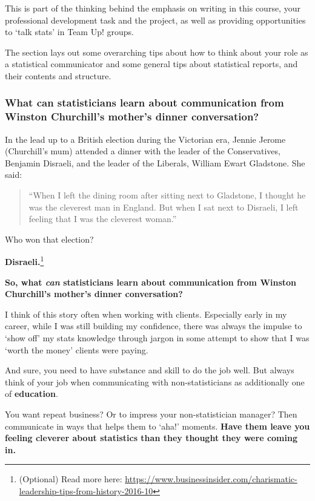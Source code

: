 \documentclass[
  openany]{book}
\begin{document}
This is part of the thinking behind the emphasis on writing in this course, your professional development task and the project, as well as providing opportunities to `talk stats' in Team Up! groups.

The section lays out some overarching tips about how to think about your role as a statistical communicator and some general tips about statistical reports, and their contents and structure.

\hypertarget{what-can-statisticians-learn-about-communication-from-winston-churchills-mothers-dinner-conversation}{%
\subsubsection{What can statisticians learn about communication from Winston Churchill's mother's dinner conversation?}\label{what-can-statisticians-learn-about-communication-from-winston-churchills-mothers-dinner-conversation}}

In the lead up to a British election during the Victorian era, Jennie Jerome (Churchill's mum) attended a dinner with the leader of the Conservatives, Benjamin Disraeli, and the leader of the Liberals, William Ewart Gladstone. She said:

\begin{quote}
``When I left the dining room after sitting next to Gladstone, I thought he was the cleverest man in England. But when I sat next to Disraeli, I left feeling that I was the cleverest woman.''
\end{quote}

Who won that election?

\textbf{Disraeli.}\footnote{(Optional) Read more here: \url{https://www.businessinsider.com/charismatic-leadership-tips-from-history-2016-10}}

\textbf{So, what \emph{can} statisticians learn about communication from Winston Churchill's mother's dinner conversation?}

I think of this story often when working with clients. Especially early in my career, while I was still building my confidence, there was always the impulse to `show off' my stats knowledge through jargon in some attempt to show that I was `worth the money' clients were paying.

And sure, you need to have substance and skill to do the job well. But always think of your job when communicating with non-statisticians as additionally one of \textbf{education}.

You want repeat business? Or to impress your non-statistician manager? Then communicate in ways that helps them to `aha!' moments. \textbf{Have them leave you feeling cleverer about statistics than they thought they were coming in.}
\end{document}
